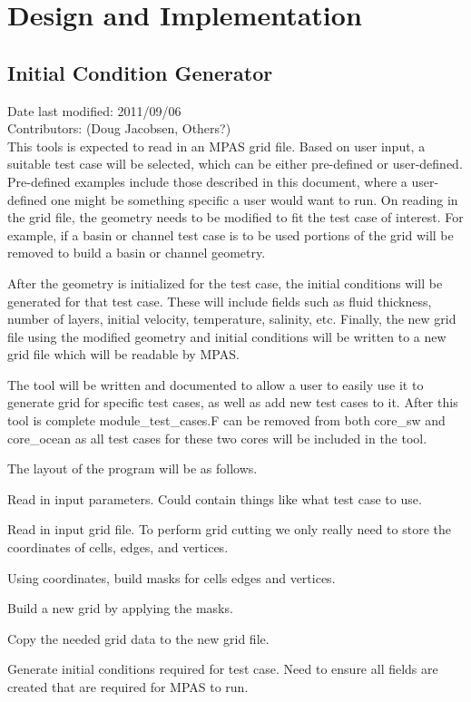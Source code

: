 \documentclass[11pt]{report}
\begin{document}
\chapter{Design and Implementation}
\section{Initial Condition Generator}
Date last modified: 2011/09/06 \\
Contributors: (Doug Jacobsen, Others?) \\

This tools is expected to read in an MPAS grid file. Based on user input, a suitable test case will be selected, which can be either pre-defined or user-defined. Pre-defined examples include those described in this document, where a user-defined one might be something specific a user would want to run. On reading in the grid file, the geometry needs to be modified to fit the test case of interest. For example, if a basin or channel test case is to be used portions of the grid will be removed to build a basin or channel geometry.

After the geometry is initialized for the test case, the initial conditions will be generated for that test case. These will include fields such as fluid thickness, number of layers, initial velocity, temperature, salinity, etc. Finally, the new grid file using the modified geometry and initial conditions will be written to a new grid file which will be readable by MPAS.

The tool will be written and documented to allow a user to easily use it to generate grid for specific test cases, as well as add new test cases to it. After this tool is complete module\_test\_cases.F can be removed from both core\_sw and core\_ocean as all test cases for these two cores will be included in the tool. 

The layout of the program will be as follows.

\begin{verbatimtab}
Read in input parameters.
	Could contain things like what test case to use.

Read in input grid file.
	To perform grid cutting we only really need to store
	the coordinates of cells, edges, and vertices.

Using coordinates, build masks for cells edges and vertices.

Build a new grid by applying the masks.

Copy the needed grid data to the new grid file.

Generate initial conditions required for test case.
	Need to ensure all fields are created that are
	required for MPAS to run.
\end{verbatimtab}
\end{document}
